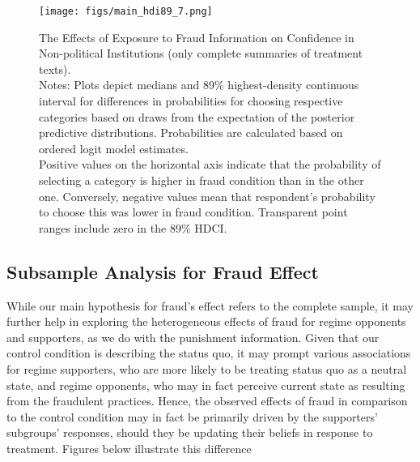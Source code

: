 \documentclass[11pt, ngerman,english,a4]{article}
\begin{document}
\begin{figure}[H]
	\centering
	\texttt{[image: figs/main\_hdi89\_7.png]}
	\caption{The Effects of Exposure to Fraud Information on Confidence in Non-political Institutions (only complete summaries of treatment texts).  \\
		\footnotesize{Notes: Plots depict medians and 89\% highest-density continuous interval for differences in probabilities for choosing respective categories based on draws from the expectation of the posterior predictive distributions. Probabilities are calculated based on ordered logit model estimates.\\
			Positive values on the horizontal axis indicate that the probability of selecting a category is higher in fraud condition than in the other one. Conversely, negative values mean that respondent's probability to choose this was lower in fraud condition. 
Transparent point ranges include zero in the 89\% HDCI.\\
	} }
	\singlespacing
	\raggedright
	    
	\label{fig:main-7}
\end{figure}

% 
% 

\clearpage
\subsection*{Subsample Analysis for Fraud Effect}

While our main hypothesis for fraud's effect refers to the complete sample, it may further help in exploring the heterogeneous effects of fraud for regime opponents and supporters, as we do with the punishment information. Given that our control condition is describing the status quo, it may prompt various associations for regime supporters, who are more likely to be treating status quo as a neutral state, and regime opponents, who may in fact perceive current state as resulting from the fraudulent practices. Hence, the observed effects of fraud in comparison to the control condition may in fact be primarily driven by the supporters' subgroups' responses, should they be updating their beliefs in response to treatment. Figures below illustrate this difference
\end{document}
